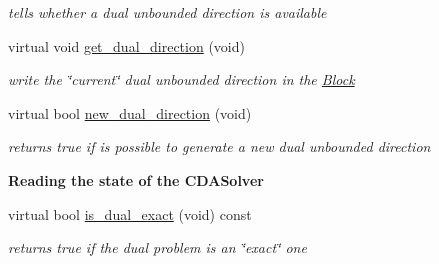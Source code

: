 \begin{Indent}
\begin{DoxyCompactItemize}
\begin{DoxyCompactList}\small\item\em tells whether a dual unbounded direction is available \end{DoxyCompactList}\item 
virtual void \mbox{\hyperlink{class_s_m_spp__di__unipi__it_1_1_c_d_a_solver_a145672680f07ca7eef090900b8d6ddcf}{get\+\_\+dual\+\_\+direction}} (void)
\begin{DoxyCompactList}\small\item\em write the \char`\"{}current\char`\"{} dual unbounded direction in the \mbox{\hyperlink{class_s_m_spp__di__unipi__it_1_1_block}{Block}} \end{DoxyCompactList}\item 
virtual bool \mbox{\hyperlink{class_s_m_spp__di__unipi__it_1_1_c_d_a_solver_ad83925e362d49bbe570a881791e45ea0}{new\+\_\+dual\+\_\+direction}} (void)
\begin{DoxyCompactList}\small\item\em returns true if is possible to generate a new dual unbounded direction \end{DoxyCompactList}\end{DoxyCompactItemize}
\end{Indent}
\begin{Indent}\textbf{ Reading the state of the C\+D\+A\+Solver}\par
\begin{DoxyCompactItemize}
\item 
virtual bool \mbox{\hyperlink{class_s_m_spp__di__unipi__it_1_1_c_d_a_solver_a402db4cab5024abd480ae2186cf467cc}{is\+\_\+dual\+\_\+exact}} (void) const
\begin{DoxyCompactList}\small\item\em returns true if the dual problem is an \char`\"{}exact\char`\"{} one \end{DoxyCompactList}\end{DoxyCompactItemize}
\end{Indent}
